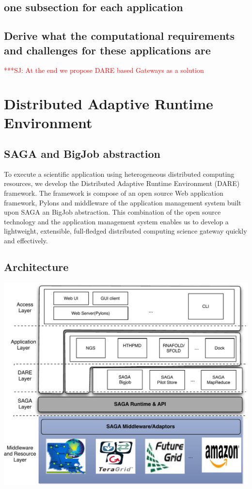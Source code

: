 \documentclass[12pt]{article}
\newcommand{\jhanote}[1]{ {\textcolor{red}     {***SJ: #1}}}
\newcommand{\jhanote}[1]{}
\begin{document}
\subsection{one subsection for each application}

\subsection{Derive what the computational requirements and challenges
  for these applications are}


\jhanote{At the end we propose DARE based Gateways as a solution}


\section{Distributed Adaptive Runtime Environment}

\subsection{SAGA and BigJob abstraction}

To execute a scientific application using heterogeneous distributed computing resources, we develop the Distributed Adaptive Runtime Environment (DARE) framework\cite{dareurl}.  The framework is compose of an open source Web application framework, Pylons
and middleware of the application management system built upon SAGA an BigJob abstraction\cite{saga-ccgrid10,saga-royalsoc,saga-web,jha2009developing,ecmls10}.  This combination of the open source technology and the application management system enables us to develop a lightweight, extensible, full-fledged distributed computing science gateway quickly and effectively\cite{pylonsurl}. 

\subsection{Architecture}

\includegraphics[scale=0.70]{figures/DAREOutline.pdf}
\end{document}
